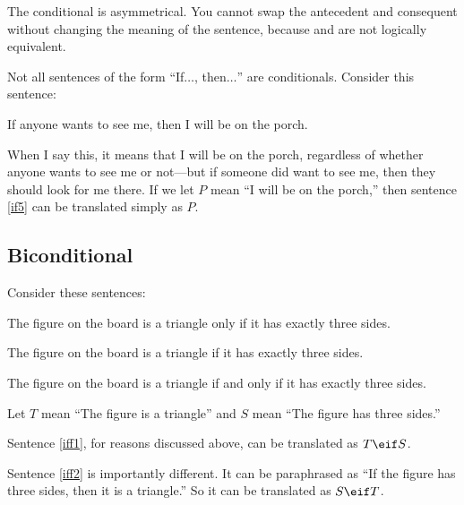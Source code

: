 The conditional is asymmetrical. You cannot swap the antecedent and consequent without changing the meaning of the sentence, because  \eif {} and  \eif {} are not logically equivalent.


Not all sentences of the form ``If$\ldots$, then$\ldots$'' are conditionals. Consider this sentence:

\begin{earg}
\item[\ex{if5}] If anyone wants to see me, then I will be on the porch.
\end{earg}

When I say this, it means that I will be on the porch, regardless of whether anyone wants to see me or not---but if someone did want to see me, then they should look for me there. If we let $P$ mean ``I will be on the porch,'' then sentence \ref{if5} can be translated simply as $P$.


\subsection{Biconditional}
Consider these sentences:
\begin{earg}
\item[\ex{iff1}] The figure on the board is a triangle only if it has exactly three sides.
\item[\ex{iff2}] The figure on the board is a triangle if it has exactly three sides.
\item[\ex{iff3}] The figure on the board is a triangle if and only if it has exactly three sides.
\end{earg}

Let $T$ mean ``The figure is a triangle'' and $S$ mean ``The figure has three sides.''

Sentence \ref{iff1}, for reasons discussed above, can be translated as $T\eif S$.

Sentence \ref{iff2} is importantly different. It can be paraphrased as ``If the figure has three sides, then it is a triangle.'' So it can be translated as $S\eif T$.

